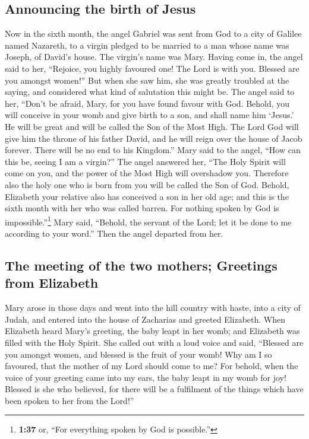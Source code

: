 \hypertarget{announcing-the-birth-of-jesus}{%
\subsection{Announcing the birth of
Jesus}\label{announcing-the-birth-of-jesus}}

 Now in the sixth month, the angel Gabriel was sent from
God to a city of Galilee named Nazareth,  to a virgin
pledged to be married to a man whose name was Joseph, of David's house.
The virgin's name was Mary.  Having come in, the angel
said to her, ``Rejoice, you highly favoured one! The Lord is with you.
Blessed are you amongst women!''  But when she saw him,
she was greatly troubled at the saying, and considered what kind of
salutation this might be.  The angel said to her, ``Don't
be afraid, Mary, for you have found favour with God. 
Behold, you will conceive in your womb and give birth to a son, and
shall name him `Jesus.'  He will be great and will be
called the Son of the Most High. The Lord God will give him the throne
of his father David,  and he will reign over the house of
Jacob forever. There will be no end to his Kingdom.'' 
Mary said to the angel, ``How can this be, seeing I am a virgin?''
 The angel answered her, ``The Holy Spirit will come on
you, and the power of the Most High will overshadow you. Therefore also
the holy one who is born from you will be called the Son of God.
 Behold, Elizabeth your relative also has conceived a son
in her old age; and this is the sixth month with her who was called
barren.  For nothing spoken by God is
impossible.''\footnote{\textbf{1:37} or, ``For everything spoken by God
  is possible.''}  Mary said, ``Behold, the servant of
the Lord; let it be done to me according to your word.'' Then the angel
departed from her.

\hypertarget{the-meeting-of-the-two-mothers-greetings-from-elizabeth}{%
\subsection{The meeting of the two mothers; Greetings from
Elizabeth}\label{the-meeting-of-the-two-mothers-greetings-from-elizabeth}}

 Mary arose in those days and went into the hill country
with haste, into a city of Judah,  and entered into the
house of Zacharias and greeted Elizabeth.  When Elizabeth
heard Mary's greeting, the baby leapt in her womb; and Elizabeth was
filled with the Holy Spirit.  She called out with a loud
voice and said, ``Blessed are you amongst women, and blessed is the
fruit of your womb!  Why am I so favoured, that the
mother of my Lord should come to me?  For behold, when
the voice of your greeting came into my ears, the baby leapt in my womb
for joy!  Blessed is she who believed, for there will be
a fulfilment of the things which have been spoken to her from the
Lord!''

